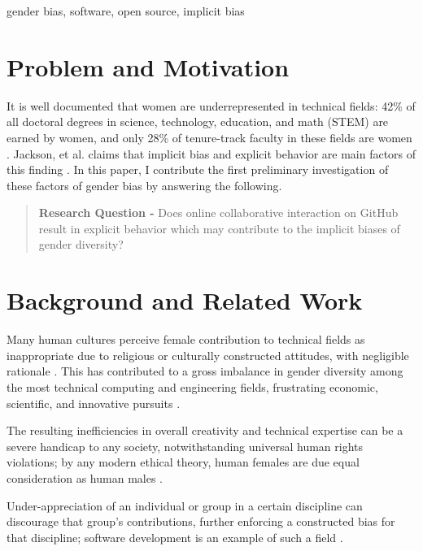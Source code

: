 \documentclass{sigplanconf}
\begin{document}
\keywords
gender bias, software, open source, implicit bias

\section{Problem and Motivation}

It is well documented that women are underrepresented in technical fields:
42\% of all doctoral degrees in science, technology, education, and
math (STEM) are earned by women, and only 28\% of tenure-track faculty in these
fields are women \citep{womenengineering}. Jackson, et al. claims that implicit
bias and explicit behavior are main
factors of this finding \citep{implicitbias}. In this paper, I
contribute the first preliminary investigation of these factors of gender bias
by answering the following.

\begin{quote}
  \textbf{Research Question -} Does online collaborative interaction on GitHub result in
  explicit behavior which may contribute to the implicit biases of gender diversity?
\end{quote}

\section{Background and Related Work}

Many human cultures perceive female contribution to technical
fields as inappropriate due to religious or culturally constructed attitudes, with
negligible rationale \citep{elamin2010saudiwomen}. This has contributed to a gross imbalance in gender diversity among
the most technical computing and engineering fields, frustrating economic,
scientific, and innovative pursuits \citep{genderscience}.

The resulting inefficiencies in overall creativity and technical expertise
can be a severe handicap to any society, notwithstanding universal human rights
violations; by any modern ethical theory, human females are due equal
consideration as human males \citep{ethicsgender}.

Under-appreciation of an individual or group in a certain
discipline can discourage that group's contributions, further enforcing a
constructed bias for that discipline; software development is an example of such
a field \citep{genderscience}.
\end{document}
